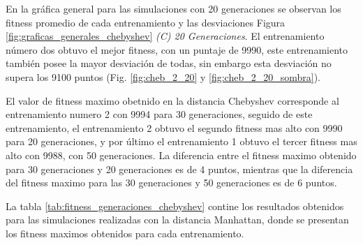 \documentclass[conference]{IEEEtran}
\begin{document}
En la gráfica general para las simulaciones con 20 generaciones se observan los fitness promedio de cada entrenamiento y las desviaciones Figura \ref{fig:graficas_generales_chebyshev} \textit{(C) 20 Generaciones}.
El entrenamiento número dos obtuvo el mejor fitness, con un puntaje de 9990, este entrenamiento también posee la mayor desviación de todas, sin embargo esta desviación no supera los 9100 puntos (Fig. \ref{fig:cheb_2_20} y \ref{fig:cheb_2_20_sombra}).

El valor de fitness maximo obetnido en la distancia Chebyshev corresponde al entrenamiento numero 2 con 9994 para 30 generaciones, seguido de este entrenamiento, el entrenamiento 2 obtuvo el segundo fitness mas alto con 9990 para 20 generaciones, y por último el entrenamiento 1 obtuvo el tercer fitness mas alto con 9988, con 50 generaciones. La diferencia entre el fitness maximo obtenido para 30 generaciones y 20 generaciones es de 4 puntos, mientras que la diferencia del fitness maximo para las 30 generaciones y 50 generaciones es de 6 puntos.

La tabla \ref{tab:fitness_generaciones_chebyshev} contine los resultados obtenidos para las simulaciones realizadas con la distancia Manhattan, donde se presentan los fitness maximos obtenidos para cada entrenamiento.
\end{document}
